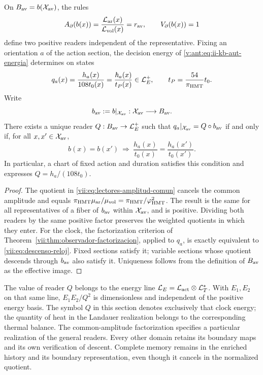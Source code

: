 \begin{proposition}
\label{vii:prop:lectores-frontera-explicitos}
On \(B_{\rm av}=b(\mathcal X_{\rm av})\), the rules
\begin{equation}
 A_\partial(b(x))
 =\frac{\mathcal L_{\rm ar}(x)}{\mathcal L_{\rm vol}(x)}
 =r_{\rm av},\qquad V_\partial(b(x))=1
 \label{vii:eq:lectores-normalizados}
\end{equation}
define two positive readers independent of the representative.
Fixing an orientation \(a\) of the action section, the decision
energy of \eqref{v:ant:eq:ii-kb-aut-energia} determines on states
\begin{equation}
 q_a(x)=\frac{h_a(x)}{108t_0(x)}
       =\frac{\hbar_a(x)}{t_P(x)}\in\mathcal L_E^+,
 \qquad t_P=\frac{54}{\pi_{\rm HMT}}t_0.
 \label{vii:eq:lector-q-accion}
\end{equation}
Write
\[
 b_{\rm av}:=b|_{\mathcal X_{\rm av}}:
 \mathcal X_{\rm av}\longrightarrow B_{\rm av}.
\]
There exists a unique reader \(Q:B_{\rm av}\to\mathcal L_E^+\) such that
\(q_a|_{\mathcal X_{\rm av}}=Q\circ b_{\rm av}\)
if and only if, for all \(x,x'\in\mathcal X_{\rm av}\),
\begin{equation}
 b(x)=b(x')\ \Longrightarrow\
 \frac{h_a(x)}{t_0(x)}=\frac{h_a(x')}{t_0(x')}.
 \label{vii:eq:descenso-reloj}
\end{equation}
In particular, a chart of fixed action and duration satisfies this
condition and expresses \(Q=h_a/(108t_0)\).
\end{proposition}
\begin{proof}
The quotient in \eqref{vii:eq:lectores-amplitud-comun} cancels the
common amplitude and equals
\(\pi_{\rm HMT}\mu_{\rm ar}/\mu_{\rm vol}
=\pi_{\rm HMT}/\varphi_{\rm HMT}^2\).
The result is the same for all representatives of a fiber
of \(b_{\rm av}\) within \(\mathcal X_{\rm av}\), and is positive.
Dividing both readers by the same positive factor preserves
the weighted quotients in which they enter.
For the clock, the factorization criterion of
Theorem~\ref{vii:thm:observador-factorizacion}, applied to \(q_a\),
is exactly equivalent to \eqref{vii:eq:descenso-reloj}. Fixed sections
satisfy it; variable sections whose quotient descends through
\(b_{\rm av}\) also satisfy it. Uniqueness follows from the definition
of \(B_{\rm av}\) as the effective image.
\end{proof}

The value of reader \(Q\) belongs to the energy line
\(\mathcal L_E=\mathcal L_{\rm act}\otimes\mathcal L_T^*\).
With \(E_1,E_2\) on that same line,
\(E_1E_2/Q^2\) is dimensionless and independent of the positive
energy basis. The symbol \(Q\) in this section denotes exclusively
that clock energy; the quantity of heat in the Landauer realization
belongs to the corresponding thermal balance.
The common-amplitude factorization specifies a particular realization
of the general readers. Every other domain retains its boundary
maps and its own verification of descent.
Complete memory remains in the enriched history and its boundary
representation, even though it cancels in the normalized quotient.


